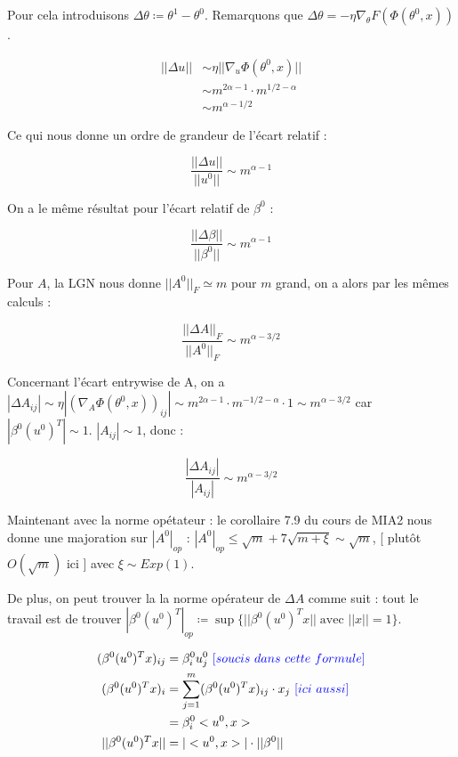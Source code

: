 \documentclass[a4paper, 11pt, french]{article}
\newcommand{\ch}[1]{{\color{blue} [ #1 ]}}
\begin{document}
	Pour cela introduisons $\Delta \theta \coloneqq \theta^1 - \theta^0$. Remarquons que $	\Delta \theta = - \eta \nabla_{\theta} F(\Phi(\theta^0, x))$.
	
	\begin{align}
		||\Delta u|| &\sim \eta || \nabla_u \Phi(\theta^0, x) || \\
		&\sim m^{2\alpha - 1} \cdot m^{1/2 - \alpha} \\
		&\sim m^{\alpha - 1/2}
	\end{align}

	Ce qui nous donne un ordre de grandeur de l'écart relatif :
	
	\[\frac{||\Delta u||}{||u^0||} \sim m^{\alpha - 1}\]
	
	On a le même résultat pour l'écart relatif de $\beta^0$ :
	
	\[\frac{||\Delta \beta||}{||\beta^0||} \sim m^{\alpha - 1}\]
	
	Pour $A$, la LGN nous donne $||A^0||_F \simeq m$ pour $m$ grand, on a alors par les mêmes calculs :
	
	\[\frac{||\Delta A||_F}{||A^0||_F} \sim m^{\alpha - 3/2}\]
	
	Concernant l'écart entrywise de A, on a $|\Delta A_{ij}| \sim \eta | (\nabla_A \Phi(\theta^0, x))_{ij} | \sim m^{2\alpha - 1} \cdot m^{-1/2 - \alpha} \cdot 1 \sim m^{\alpha - 3/2}$ car $|\beta^0 (u^0)^T| \sim 1$. $|A_{ij}| \sim 1$, donc :

	\[\frac{|\Delta A_{ij}|}{|A_{ij}|} \sim m^{\alpha - 3/2}\]
	
	Maintenant avec la norme opétateur : le corollaire 7.9 du cours de MIA2 nous donne une majoration sur $|A^0|_{op}$ : $|A^0|_{op} \leq \sqrt{m} + 7\sqrt{m + \xi} \sim \sqrt{m}$, \ch{plut\^ot $O(\sqrt{m})$ ici} avec $\xi \sim Exp(1)$.
	
	De plus, on peut trouver la la norme opérateur de $\Delta A$ comme suit : tout le travail est de trouver $|\beta^0 (u^0)^T|_{op} \coloneqq \sup \{||\beta^0 (u^0)^T x|| \; 
	\text{avec }||x|| = 1\}$.
	
	\begin{align}
		(\beta^0 (u^0)^T x)_{ij} &= \beta^0_i u^0_j\ \ch{soucis\ dans\ cette\ formule}\\
		(\beta^0 (u^0)^T x)_i &= \sum_{j=1}^{m} (\beta^0 (u^0)^T x)_{ij} \cdot x_j\ \ch{ici\ aussi} \\
		&= \beta^0_i < u^0, x> \\
		||\beta^0 (u^0)^T x|| &= |< u^0, x>| \cdot ||\beta^0||
	\end{align}
\end{document}
